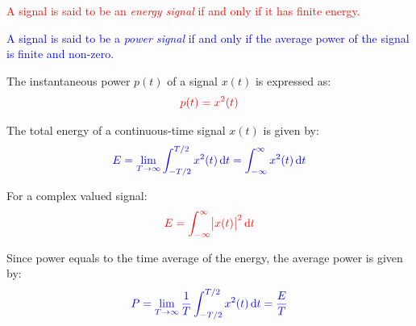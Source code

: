 \documentclass[
  12pt,
  a4paper,
]{report}
\newcommand{\bluetext}[1]{\textcolor{blue}{#1}}
\begin{document}
\begin{tcolorbox}[colback=boxbodycol, colframe=boxheadcol, title=\bluetext{\textbf{Energy Signals}}]\label{fig:energy-signal-def-tcbox}
    \begin{center}
        \textcolor{red}{A signal is said to be an \emph{energy signal} if and only if it has finite energy.}
    \end{center}
\end{tcolorbox}
\begin{tcolorbox}[colback=boxbodycol, colframe=boxheadcol, title=\textcolor{red}{\textbf{Power Signals}}]\label{fig:power-signal-def-tcbox}
    \begin{center}
        \bluetext{A signal is said to be a \emph{power signal} if and only if the average power of the signal is finite and non-zero.}
    \end{center}
\end{tcolorbox}
\begin{tcolorbox}[colback=boxbodycol, colframe=boxheadcol, title=\textcolor{red}{\textbf{Instantaneous Power}}]\label{fig:instantaneous-power-def}
The instantaneous power \(p(t)\) of a signal \(x(t)\) is expressed as:
    \begin{equation}
        \label{eq:instantaneous-power-def}
        \textcolor{red}{p(t) = x^2(t)}
    \end{equation}
\end{tcolorbox}
\begin{tcolorbox}[colback=boxbodycol, colframe=boxheadcol, title=\textcolor{red}{\textbf{Continuous-Time Signal Energy}}]\label{fig:continuous-time-energy-def}
The total energy of a continuous-time signal \(x(t)\) is given by:
    \begin{equation}
        \label{eq:continuous-time-energy-def}     
        \bluetext{E = \lim_{T \to \infty}\int_{-T/2}^{T/2} x^2(t) \dd{t} = \int_{-\infty}^{\infty} x^2(t) \dd{t}} 
    \end{equation}
\end{tcolorbox}
\begin{tcolorbox}[colback=boxbodycol, colframe=boxheadcol, title=\textcolor{red}{\textbf{Complex Valued Signal Energy}}]\label{fig:complex-signal-energy-def}
For a complex valued signal:
    \begin{equation}
        \label{eq:complex-signal-energy-def}
        \textcolor{red}{E = \int_{-\infty}^{\infty} \abs{x(t)}^2 \dd{t}} 
    \end{equation}
\end{tcolorbox}
\begin{tcolorbox}[colback=boxbodycol, colframe=boxheadcol, title=\textcolor{red}{\textbf{Average Power}}]\label{fig:average-power-def}
Since power equals to the time average of the energy, the average power is given by:
    \begin{equation}     
        \label{eq:average-power-def}     
        \textcolor{blue}{P = \lim_{T \to \infty} \frac{1}{T} \int_{-T/2}^{T/2} x^2(t) \dd{t} = \frac{E}{T}}
    \end{equation}
\end{tcolorbox}
\end{document}
